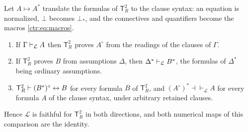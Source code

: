 \begin{theorem}\label{ctr:thm:adequacy}
Let $A\mapsto A^*$ translate the formulas of $\mathsf T_R^2$ to the clause syntax: an
equation is normalized, $\bot$ becomes $\bot_*$, and the connectives and quantifiers become
the macros \eqref{ctr:eq:macros}.
\begin{enumerate}
\item If $\Gamma\vdash_{\mathcal L}A$ then $\mathsf T_R^2$ proves $A^\circ$ from the
readings of the clauses of $\Gamma$.
\item If $\mathsf T_R^2$ proves $B$ from assumptions $\Delta$, then
$\Delta^*\vdash_{\mathcal L}B^*$, the formulas of $\Delta^*$ being ordinary assumptions.
\item $\mathsf T_R^2\vdash(B^*)^\circ\leftrightarrow B$ for every formula $B$ of
$\mathsf T_R^2$, and $(A^\circ)^*\dashv\vdash_{\mathcal L}A$ for every formula $A$ of the
clause syntax, under arbitrary retained clauses.
\end{enumerate}
Hence $\mathcal L$ is faithful for $\mathsf T_R^2$ in both directions, and both numerical
maps of this comparison are the identity.
\end{theorem}
